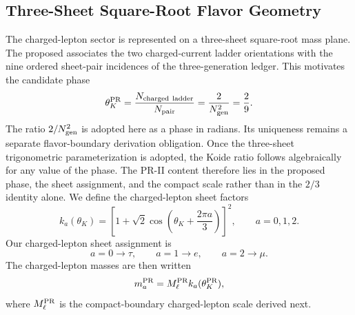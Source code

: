 \documentclass[11pt]{article}
\begin{document}
\subsection{Three-Sheet Square-Root Flavor Geometry}
\label{sec:pr2_three_sheet_square_root_flavor_geometry}
The charged-lepton sector is represented on a three-sheet square-root mass plane. The proposed associates the two charged-current ladder orientations with the nine ordered sheet-pair incidences of the three-generation ledger. This motivates the candidate phase
\begin{equation}
\theta_K^{\rm PR}
=
\frac{N_{\rm charged\ ladder}}{N_{\rm pair}}
=
\frac{2}{N_{\rm gen}^2}
=
\frac29.
\end{equation}
The ratio \(2/N_{\rm gen}^2\) is adopted here as a phase in radians. Its uniqueness remains a separate flavor-boundary derivation obligation. Once the three-sheet trigonometric parameterization is adopted, the Koide ratio follows algebraically for any value of the phase. The PR-II content therefore lies in the proposed phase, the sheet assignment, and the compact scale rather than in the \(2/3\) identity alone. We define the charged-lepton sheet factors
\begin{equation}
k_a(\theta_K)
=
\left[
1+\sqrt2\cos
\left(
\theta_K+\frac{2\pi a}{3}
\right)
\right]^2,
\qquad
a=0,1,2.
\end{equation}
Our charged-lepton sheet assignment is
\begin{equation}
a=0\rightarrow\tau,
\qquad
a=1\rightarrow e,
\qquad
a=2\rightarrow\mu.
\end{equation}
The charged-lepton masses are then written
\begin{equation}
m_a^{\rm PR}
=
M_\ell^{\rm PR}k_a(\theta_K^{\rm PR}),
\end{equation}
where \(M_\ell^{\rm PR}\) is the compact-boundary charged-lepton scale derived next.
\end{document}
